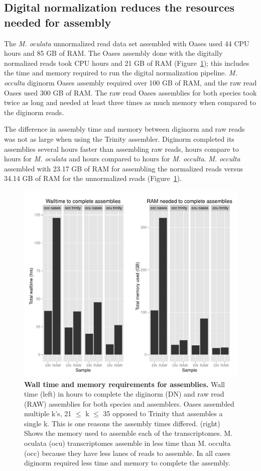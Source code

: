 \documentclass[fleqn,10pt]{wlpeerj}
\begin{document}
\subsection{Digital normalization reduces the resources needed for assembly}
 The \textit{M. oculata} unnormalized read data set assembled with Oases used 44 CPU hours and 85 GB of RAM. The Oases assembly done with the digitally normalized reads took  CPU hours and 21 GB of RAM (Figure~\ref{fig:time_and_memory.pdf}); this includes the time and memory required to run the digital normalization pipeline. \textit{M. occulta} diginorm Oases assembly required over 100 GB of RAM, and the raw read Oases used 300 GB of RAM. The raw read Oases assemblies for both species took twice as long and needed at least three times as much memory when compared to the diginorm reads.

The difference in assembly time and memory between diginorm and raw reads was not as large when using the Trinity assembler. Diginorm completed its assemblies several hours faster than assembling raw reads,  hours compare to  hours for \textit{M. oculata} and  hours compared to  hours for \textit{M. occulta}. \textit{M. occulta} assembled with 23.17 GB of RAM for assembling the normalized reads versus 34.14 GB of RAM for the unnormalized reads (Figure~\ref{fig:time_and_memory.pdf}).

\begin{figure}[tbp]
\centering
\includegraphics[scale=0.5]{figure_1_time_and_memory.pdf}
\caption{\textbf{Wall time and memory requirements for assemblies.} Wall time (left) in hours to complete the diginorm (DN) and raw read (RAW) assemblies for both species and assemblers. Oases assembled multiple k's, 21 $\leq$ k $\leq$ 35 opposed to Trinity that assembles a single k. This is one reasons the assembly times differed. (right) Shows the memory used to assemble each of the transcriptomes. M. oculata (ocu) transcriptomes assemble in less time than M. occulta (occ) because they have less lanes of reads to assemble. In all cases diginorm required less time and memory to complete the assembly.}
\label{fig:time_and_memory.pdf}
\end{figure}
  
\end{document}
